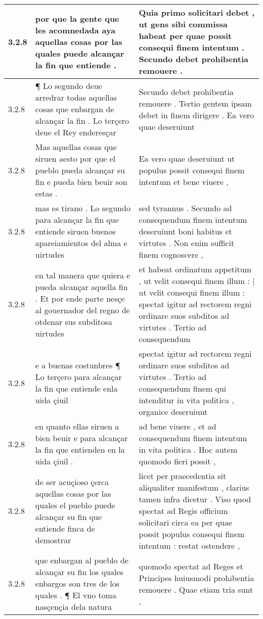 \begin{tabular}{|p{1cm}|p{6.5cm}|p{6.5cm}|}
3.2.8 & por que la gente que les acomnedada aya aquellas cosas por las quales puede alcançar la fin que entiende . & Quia primo solicitari debet , ut gens sibi commissa habeat per quae possit consequi finem intentum . Secundo debet prohibentia remouere . \\\hline
3.2.8 & ¶ Lo segundo deue arredrar todas aquellas cosas que enbargan de alcançar la fin . Lo terçero deue el Rey enderesçar & Secundo debet prohibentia remouere . Tertio gentem ipsam debet in finem dirigere . Ea vero quae deseruiunt \\\hline
3.2.8 & Mas aquellas cosas que siruen aesto por que el pueblo pueda alcançar su fin e pueda bien beuir son estas . & Ea vero quae deseruiunt ut populus possit consequi finem intentum et bene viuere , \\\hline
3.2.8 & mas es tirano . Lo segundo para alcançar la fin que entiende siruen buenos apareiamientos del alma e uirtudes & sed tyrannus . Secundo ad consequendum finem intentum deseruiunt boni habitus et virtutes . Non enim sufficit finem cognoscere , \\\hline
3.2.8 & en tal manera que quiera e pueda alcançar aquella fin . Et por ende parte nesçe al gouernador del regno de otdenar sus subditosa uirtudes & et habeat ordinatum appetitum , ut velit consequi finem illum : | ut velit consequi finem illum : spectat igitur ad rectorem regni ordinare suos subditos ad virtutes . Tertio ad consequendum \\\hline
3.2.8 & e a buenas costunbres ¶ Lo terçero para alcançar la fin que entiende enla uida çiuil & spectat igitur ad rectorem regni ordinare suos subditos ad virtutes . Tertio ad consequendum finem qui intenditur in vita politica , organice deseruiunt \\\hline
3.2.8 & en quanto ellas siruen a bien beuir e para alcançar la fin que entienden en la uida çiuil . & ad bene viuere , et ad consequendum finem intentum in vita politica . Hoc autem quomodo fieri possit , \\\hline
3.2.8 & de ser acuçioso çerca aquellas cosas por las quales el pueblo puede alcançar su fin que entiende finca de demostrar & licet per praecedentia sit aliqualiter manifestum , clarius tamen infra dicetur . Viso quod spectat ad Regis officium solicitari circa ea per quae possit populus consequi finem intentum : restat ostendere , \\\hline
3.2.8 & que enbargan al pueblo de alcançar su fin los quales enbargos son tres de los quales . ¶ El vno toma nasçençia dela natura & quomodo spectat ad Reges et Principes huiusmodi prohibentia remouere . Quae etiam tria sunt , \\\hline

\end{tabular}
